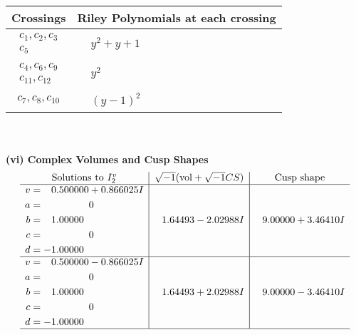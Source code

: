 \documentclass[1p]{elsarticle_modified}
\theoremstyle{definition}
\newcommand{\I}{\sqrt{-1}}
\begin{document}
\begin{tabular}{m{50pt}|m{274pt}}
Crossings & \hspace{64pt}Riley Polynomials at each crossing \\
\hline $$\begin{aligned}c_{1},c_{2},c_{3}\\c_{5}\end{aligned}$$&$\begin{aligned}
&y^2+y+1
\end{aligned}$\\
\hline $$\begin{aligned}c_{4},c_{6},c_{9}\\c_{11},c_{12}\end{aligned}$$&$\begin{aligned}
&y^2
\end{aligned}$\\
\hline $$\begin{aligned}c_{7},c_{8},c_{10}\end{aligned}$$&$\begin{aligned}
&(y-1)^2
\end{aligned}$\\
\hline
\end{tabular}\\~\\
\newpage\flushleft \textbf{(vi) Complex Volumes and Cusp Shapes}
$$\begin{array}{c|c|c}  
\text{Solutions to }I^v_{2}& \I (\text{vol} + \sqrt{-1}CS) & \text{Cusp shape}\\
 \hline 
\begin{aligned}
v &= \phantom{-}0.500000 + 0.866025 I \\
a &= \phantom{-0.000000 } 0 \\
b &= \phantom{-}1.00000\phantom{ +0.000000I} \\
c &= \phantom{-0.000000 } 0 \\
d &= -1.00000\phantom{ +0.000000I}\end{aligned}
 & \phantom{-}1.64493 - 2.02988 I & \phantom{-}9.00000 + 3.46410 I \\ \hline\begin{aligned}
v &= \phantom{-}0.500000 - 0.866025 I \\
a &= \phantom{-0.000000 } 0 \\
b &= \phantom{-}1.00000\phantom{ +0.000000I} \\
c &= \phantom{-0.000000 } 0 \\
d &= -1.00000\phantom{ +0.000000I}\end{aligned}
 & \phantom{-}1.64493 + 2.02988 I & \phantom{-}9.00000 - 3.46410 I\\
 \hline 
 \end{array}$$\newpage\newpage\renewcommand{\arraystretch}{1}
\end{document}
